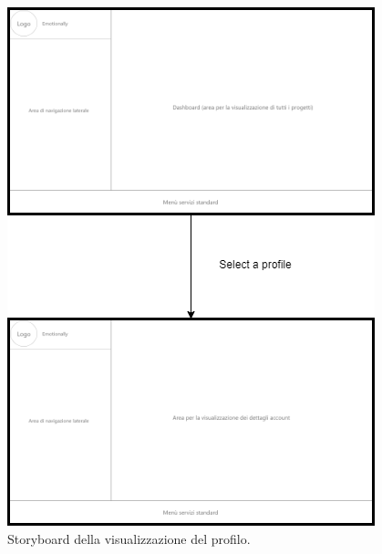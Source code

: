 \begin{figure}[H]
	\centering
	\caption{Storyboard della visualizzazione del profilo.}
	\label{fig:storyboard:profilo}
	\includegraphics[height=\textheight-3ex]{images/storyboard/profile}
\end{figure}
